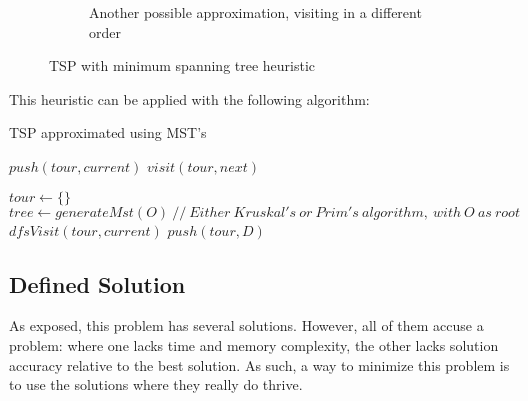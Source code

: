 \documentclass[a4paper, 12pt]{report}
\begin{document}
\begin{figure}[h]
\begin{subfigure}[b]{0.45\textwidth}
            \caption{Another possible approximation, visiting in a different order}
        \end{subfigure}

        \caption{TSP with minimum spanning tree heuristic}
        \label{fig:tspmst}
    \end{figure}
    
    \pagebreak
    
    This heuristic can be applied with the following algorithm:
    
      \begin{algorithm}
    	\caption{TSP approximated using MST's} 
	    \begin{algorithmic}[1]
	    
            \State $push(tour, current)$
                \State $visit(tour, next)$
    	    \EndFor
	    \EndFunction

	    \State $tour \leftarrow \{\}$
        \State $tree \leftarrow generateMst(O) \ // \ Either\ Kruskal's\ or\ Prim's\ algorithm,\ with\ O\ as\ root$ 
        \State $dfsVisit(tour, current)$
        \State $push(tour, D)$
		
	    \end{algorithmic} 
	\end{algorithm}
    
     \subsection{Defined Solution} \label{solution}
    
    As exposed, this problem has several solutions. However, all of them accuse a problem: where one lacks time and memory complexity, the other lacks solution accuracy relative to the best solution. As such, a way to minimize this problem is to use the solutions where they really do thrive.
    
\end{document}
